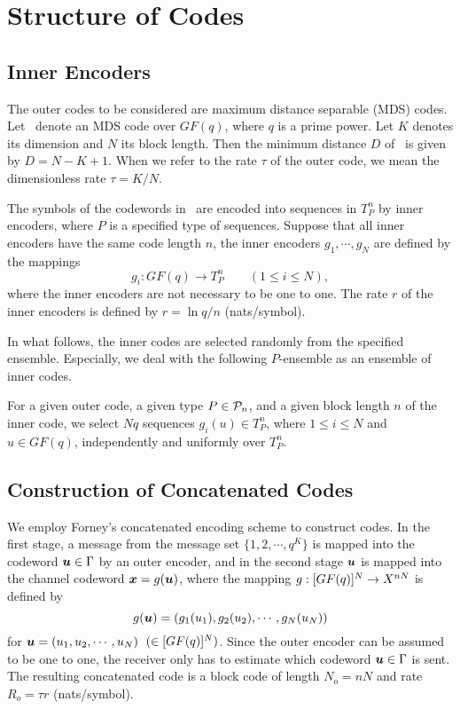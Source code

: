 \chapter{Structure of Codes}
\section{Inner Encoders}
The outer codes to be considered are maximum distance
separable (MDS) codes. Let \g\ denote
an MDS code over $GF(q)$, where $q$ is a prime power.
Let $K$ denotes its dimension and $N$ its block length.
Then the minimum distance $D$ of \g\ is given by $D=N-K+1$.
When we refer to the rate $\tau$ of the outer code, we
mean the dimensionless rate $\tau=K/N$.

The symbols of the codewords in \g\  are encoded into sequences in $T^n_P$
by inner encoders, where $P$ is a specified type of sequences.
Suppose that all inner encoders have the same code length $n$,
the inner encoders $g_1,\cdots ,g_N$ are defined by the mappings
\[
g_i : GF(q) \rightarrow T^n_P  \qquad (1 \leq i \leq N),
\]
where the inner encoders are not necessary to be one to one. The rate $r$
of the inner encoders is defined by $r = \ln q/n$ (nats/symbol).

In what follows, the inner codes are selected randomly from the
specified ensemble. Especially, we deal with the following
$P$-ensemble as an ensemble of inner codes.
\begin{defini}[$P$-ensemble]
{\rm
For a given outer code, a given type $P\in{\cal P}_n$,
and a given block length $n$ of the inner code,
we select $Nq$ sequences $g_i(u)\in T^n_P$, where $1\le i\le N$
and $u\in GF(q)$, independently and uniformly over $T^n_P$.
}
\end{defini}

\section{Construction of Concatenated Codes}
We employ Forney's concatenated encoding scheme\cite{fo} to construct
codes. In the first stage, 
a message from the message set $\{1,2, \cdots ,q^K\}$ is mapped into the
codeword $\mbox{\boldmath $u$} \in \mbox{$\Gamma$}$ by an outer encoder, and in the second stage
$\mbox{\boldmath $u$}$ is mapped into the channel codeword $\mbox{\boldmath $x$} = g(\mbox{\boldmath $u$})$, where
the mapping $g : [\mbox{$GF(q)$}]^N \rightarrow X^{nN}$ is defined by
\[
g( \mbox{\boldmath $u$})=(g_1(u_1),g_2(u_2), \cdots ,g_{N}(u_{N}))
\]
for $\mbox{\boldmath $u$} = (u_1, u_2, \cdots , u_N)$\ $(\in [\mbox{$GF(q)$}]^N)$.
Since the outer encoder can be assumed to be one to one, 
the receiver only has to estimate which codeword $ \mbox{\boldmath $u$} \in \Gamma$ is
sent. The resulting concatenated code is a block code of 
length $N_o=nN$ and rate $R_o = \tau r$ (nats/symbol).

